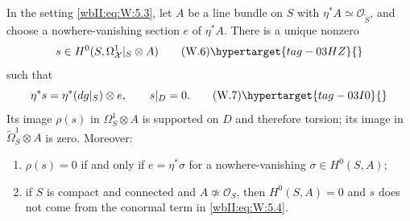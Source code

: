 \begin{theorem}
\hypertarget{tag-03IK}{}\label{wbII:prop:conductor}
\label{wbII:prop:conductor-differential}
In the setting \eqref{wbII:eq:W:5.3}, let $A$ be a line bundle on $S$ with
$\eta^*A\simeq\mathcal O_{\widetilde S}$, and choose a nowhere-vanishing
section $e$ of $\eta^*A$.  There is a unique nonzero
\[
s\in H^0(S,\Omega^1_{\mathcal X}|_S\otimes A)
\tag{W.6}\hypertarget{tag-03HZ}{}\label{wbII:eq:W:5.6}
\]
such that
\[
\eta^*s=\eta^*(dg|_S)\otimes e,\qquad s|_D=0.
\tag{W.7}\hypertarget{tag-03I0}{}\label{wbII:eq:W:5.7}
\]
Its image $\rho(s)$ in $\Omega^1_S\otimes A$ is supported on $D$ and
therefore torsion; its image in
$\widetilde\Omega^1_S\otimes A$ is zero.  Moreover:
\begin{enumerate}[label=(\alph*)]
\item $\rho(s)=0$ if and only if $e=\eta^*\sigma$ for a nowhere-vanishing
$\sigma\in H^0(S,A)$;
\item if $S$ is compact and connected and $A\not\simeq\mathcal O_S$, then
$H^0(S,A)=0$ and $s$ does not come from the conormal term in \eqref{wbII:eq:W:5.4}.
\end{enumerate}
\end{theorem}



